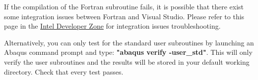 \documentclass[10pt,a4paper,oneside]{article}
\begin{document}
 If the compilation of the Fortran subroutine fails, it is possible that there exist some integration issues between Fortran and Visual Studio. Please refer to this page in the \href{https://software.intel.com/en-us/articles/troubleshooting-fortran-integration-issues-with-visual-studio}{Intel Developer Zone} for integration issues troubleshooting.
 
 Alternatively, you can only test for the standard user subroutines by launching an Abaqus command prompt and type: \textbf{"abaqus verify -user_std"}. This will only verify the user subroutines and the results will be stored in your default working directory. Check that every test passes.
\end{document}
